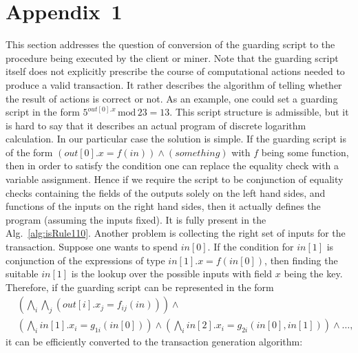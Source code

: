 \documentclass[runningheads]{llncs}
\begin{document}
    \section{Appendix~1}
    \label{appendix1}
    This section addresses the question of conversion of the guarding script to
    the procedure being executed by the client or miner. Note that the guarding
    script itself does not explicitly prescribe the course of computational
    actions needed to produce a valid transaction. It rather describes the
    algorithm of telling whether the result of actions is correct or not. As an
    example, one could set a guarding script in the form
    $5^{out[0].x}\,\textrm{mod}\, 23 = 13$. This script structure is admissible,
    but it is hard to say that it describes an actual program of discrete
    logarithm calculation. In our particular case the solution is simple. If the
    guarding script is of the form $(out[0].x=f(in))\wedge(something)$ with $f$
    being some function, then in order to satisfy the condition one can replace
    the equality check with a variable assignment. Hence if we require the script
    to be conjunction of equality checks containing the fields of the outputs
    solely on the left hand sides, and functions of the inputs on the right hand
    sides, then it actually defines the program (assuming the inputs fixed). It
    is fully present in the Alg.~\ref{alg:isRule110}. Another problem is collecting the right set
    of inputs for the transaction. Suppose one wants to spend $in[0]$. If the
    condition for $in[1]$ is conjunction of the expressions of type
    $in[1].x=f(in[0])$, then finding the suitable $in[1]$ is the lookup over the
    possible inputs with field $x$ being the key. Therefore, if the guarding
    script can be represented in the form
    \begin{eqnarray}
        \label{eq:scr}
        \nonumber
        &\left(\bigwedge_i\bigwedge_j(out[i].x_j=f_{ij}(in))\right)\wedge \\ 
        &\left(\bigwedge_i in[1].x_i  = g_{1i}(in[0])\right)\wedge
        \left(\bigwedge_i in[2].x_i =
        g_{2i}(in[0],in[1])\right)\wedge\dots,
        \label{eq:convertable}
    \end{eqnarray}
    it can be efficiently converted to the transaction generation algorithm:
\end{document}
